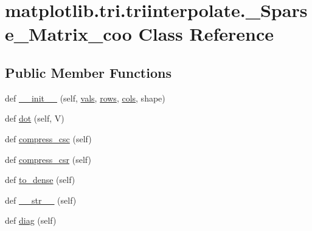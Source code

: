 \hypertarget{classmatplotlib_1_1tri_1_1triinterpolate_1_1__Sparse__Matrix__coo}{}\section{matplotlib.\+tri.\+triinterpolate.\+\_\+\+Sparse\+\_\+\+Matrix\+\_\+coo Class Reference}
\label{classmatplotlib_1_1tri_1_1triinterpolate_1_1__Sparse__Matrix__coo}
\subsection*{Public Member Functions}
\begin{DoxyCompactItemize}
\item 
def \hyperlink{classmatplotlib_1_1tri_1_1triinterpolate_1_1__Sparse__Matrix__coo_ad3100094a24d21cce002599ccc71d241}{\+\_\+\+\_\+init\+\_\+\+\_\+} (self, \hyperlink{classmatplotlib_1_1tri_1_1triinterpolate_1_1__Sparse__Matrix__coo_a5612eaa0dd35a3b3aa32e70b75caf87e}{vals}, \hyperlink{classmatplotlib_1_1tri_1_1triinterpolate_1_1__Sparse__Matrix__coo_ab6ab2e1e4113a80306bbe56713e297f8}{rows}, \hyperlink{classmatplotlib_1_1tri_1_1triinterpolate_1_1__Sparse__Matrix__coo_a9fcf91261546f911c9a1c9f7d00be92b}{cols}, shape)
\item 
def \hyperlink{classmatplotlib_1_1tri_1_1triinterpolate_1_1__Sparse__Matrix__coo_a04cdd5a40181cc08d30ab7d961c83714}{dot} (self, V)
\item 
def \hyperlink{classmatplotlib_1_1tri_1_1triinterpolate_1_1__Sparse__Matrix__coo_a8506e15202842d19c40751b31a949bb0}{compress\+\_\+csc} (self)
\item 
def \hyperlink{classmatplotlib_1_1tri_1_1triinterpolate_1_1__Sparse__Matrix__coo_ad4c4d7a6c95e05d9d6955adb1261ca6b}{compress\+\_\+csr} (self)
\item 
def \hyperlink{classmatplotlib_1_1tri_1_1triinterpolate_1_1__Sparse__Matrix__coo_a13c64db5cbb7c740538480f37202aa45}{to\+\_\+dense} (self)
\item 
def \hyperlink{classmatplotlib_1_1tri_1_1triinterpolate_1_1__Sparse__Matrix__coo_a1bf140fe485e07444f0f7496abb95d22}{\+\_\+\+\_\+str\+\_\+\+\_\+} (self)
\item 
def \hyperlink{classmatplotlib_1_1tri_1_1triinterpolate_1_1__Sparse__Matrix__coo_abd6577f8dc369ce9ff067882690f4c03}{diag} (self)
\end{DoxyCompactItemize}
